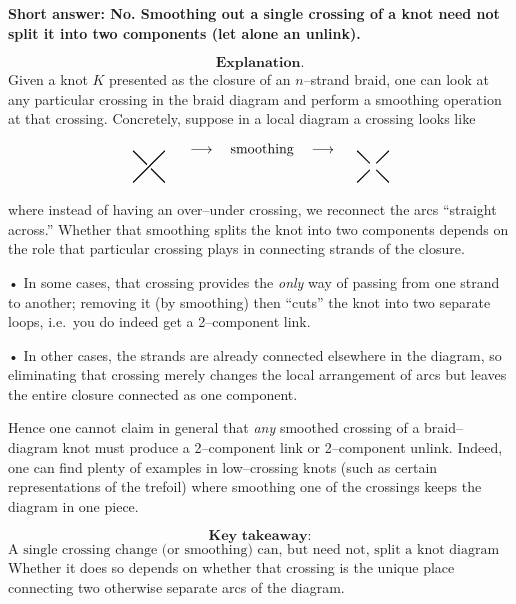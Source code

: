 \documentclass[12p]{article}
\newcounter{answercounter}
\newenvironment{answer}[1][]
{\refstepcounter{answercounter}%
\begin{tcolorbox}[
    title=Answer \theanswercounter: #1,
    colback=white, %
    colframe=gray,
    coltext=black, %
    fonttitle=\bfseries\normalsize,
    top=2mm,
    bottom=2mm,
    enlarge top initially by=5mm
]
\small
}
{\end{tcolorbox}}
\begin{document}
\begin{answer}[by openai/o1 (generated in 0 minutes and 33 seconds.)]

\textbf{Short answer: No.  Smoothing out a single crossing of a knot need not split it into two components (let alone an unlink).}


\[
\textbf{Explanation.}
\]
Given a knot \(K\) presented as the closure of an \(n\)–strand braid, one can look at any particular crossing in the braid diagram and perform a smoothing operation at that crossing.  Concretely, suppose in a local diagram a crossing looks like

\[
\raisebox{-1.3em}{
\begin{tikzpicture}[scale=0.4,baseline={([yshift=-0.8ex]current bounding box.center)}]
\draw [thick] (-1,1) -- (1,-1);
\draw [white, line width=4pt] (1,1) -- (-1,-1);
\draw [thick] (1,1) -- (-1,-1);
\end{tikzpicture}
}
\quad
\longrightarrow
\quad
\text{smoothing}
\quad
\longrightarrow
\quad
\raisebox{-1.3em}{
\begin{tikzpicture}[scale=0.4,baseline={([yshift=-0.8ex]current bounding box.center)}]
\draw [thick] (-1,1) --(-0.2,0.2);
\draw [thick] (1,1)  --(0.2,0.2);
\draw [thick] (-1,-1)--(-0.2,-0.2);
\draw [thick] (1,-1) --(0.2,-0.2);
\end{tikzpicture}
}
\]

where instead of having an over–under crossing, we reconnect the arcs “straight across.”  Whether that smoothing splits the knot into two components depends on the role that particular crossing plays in connecting strands of the closure.  

• In some cases, that crossing provides the \emph{only} way of passing from one strand to another; removing it (by smoothing) then “cuts” the knot into two separate loops, i.e.\ you do indeed get a 2–component link.

• In other cases, the strands are already connected elsewhere in the diagram, so eliminating that crossing merely changes the local arrangement of arcs but leaves the entire closure connected as one component.

Hence one cannot claim in general that \emph{any} smoothed crossing of a braid–diagram knot must produce a 2–component link or 2–component unlink.  Indeed, one can find plenty of examples in low–crossing knots (such as certain representations of the trefoil) where smoothing one of the crossings keeps the diagram in one piece.

\[
\textbf{Key takeaway:}
\]
\[
\boxed{\text{A single crossing change (or smoothing) can, but need not, split a knot diagram into two components.}}
\]
Whether it does so depends on whether that crossing is the unique place connecting two otherwise separate arcs of the diagram.
\end{answer}
\end{document}
